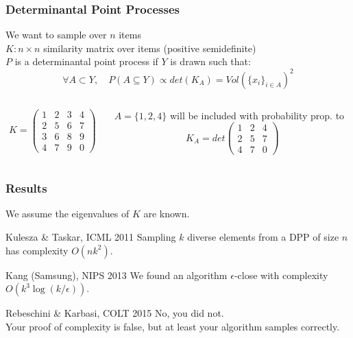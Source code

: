 \documentclass[handout]{beamer}
\begin{document}
\begin{frame}
    \frametitle{Determinantal Point Processes}
    We want to sample over $n$ items\\
    $K : n \times n$ \alert{similarity matrix} over items (positive semidefinite)\\[5mm]
    $P$ is a \alert{determinantal point process} if $Y$ is drawn such that:
    \[ \forall A \subset Y, \quad P(A \subseteq Y) \propto det(K_A) = Vol(\{x_i\}_{i \in A})^2 \]
    \begin{example}
    \begin{columns}
    \begin{column}{0.5\textwidth}
    \[ K = \left(\begin{array}{cccc}
    1 & 2 & 3 & 4\\
    2 & 5 & 6 & 7\\
    3 & 6 & 8 & 9\\
    4 & 7 & 9 & 0
    \end{array}\right) \]
    \end{column}
    \begin{column}{0.5\textwidth}
    $A = \{1, 2, 4\}$ will be included with probability prop. to
    \[ K_A = det\left(\begin{array}{ccc}
    1 & 2 & 4\\
    2 & 5 & 7\\
    4 & 7 & 0
    \end{array}\right) \]
    \end{column}
    \end{columns}
    \end{example}
\end{frame}

\begin{frame}
  \frametitle{Results}
  We assume the eigenvalues of $K$ are known.
  \begin{block}{Kulesza \& Taskar, ICML 2011}
  Sampling $k$ diverse elements from a DPP of size $n$ has complexity $O(nk^2)$.
  \end{block}
  \pause
  \begin{block}{Kang (Samsung), NIPS 2013}
  We found an algorithm $\epsilon$-close with complexity $O(k^3 \log (k / \epsilon))$.
  \end{block}
  \pause
  \begin{block}{Rebeschini \& Karbasi, COLT 2015}
  No, you did not.\\\pause
  Your proof of complexity is false, but at least your algorithm samples correctly.
  \end{block}
\end{frame}
\end{document}
